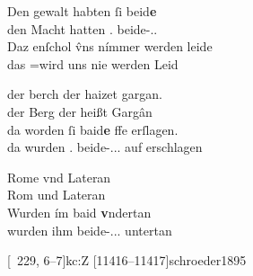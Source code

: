 \begin{exe}
\ex \label{ex:neutralpos}
	\gll Den gewalt habten ſi beid\textbf{e} \\
		den Macht hatten \Tpl\subM.\Nom{} beide-\Nom.\Pl\subM.\St{} \\
\sn \gll Daz enſchol v̂ns nímmer werden leide \\
		das \Neg=wird uns nie werden Leid \\
	\begin{taggedline}{\parencites%
		[\pno~13\ra, 41--42]{kc:B1}[vgl.]%
		[\pno~18\rb, 3]{kc:A1}
		[\pno~24\vb, 35]{kc:H}
		[\pno~32\ra, 3]{kc:M}
		[\pno~21\ra, 31]{kc:VB}
		[\pno~37\ra, 26]{kc:P}
		[\pno~23\rb, 5]{kc:C1}
		[\pno~25\rb, 39]{kc:K}
		[\pno~83\ra, 5]{kc:Z}
		[4261--4264]{schroeder1895}
	}
	\trans {}
	\end{taggedline}

\ex \label{ex:neutralpos2}
	\begin{xlist}
	\ex \label{ex:neutralpos2_1}
		\gll der berch der haizet gargan. \\
			der Berg der heißt Gargân \\
	\sn \gll da worden ſi baid\textbf{e} \textbf{}ffe erſlagen. \\
			da wurden \Tpl\subM.\Nom{} beide-\Nom.\Pl.\MascM.\St{} auf
				erschlagen \\
		\begin{taggedline}{\parencites%
			[\pno~33\rb, 28--30]{kc:A1}[vgl.]%
			[\pno~46\ra, 12]{kc:H}
			[\pno~58\vb, 15]{kc:M}
			[\pno~40\va, 15]{kc:C1}
			[\pno~46\va, 30]{kc:K}
			[\pno~152\va, 5]{kc:Z}
			[7704--7705]{schroeder1895}}
		\trans {}
		\end{taggedline}

	\ex \label{ex:neutralpos2_2}
		\gll Rome vnd Lateran \\
			Rom und Lateran \\
	\sn \gll Wurden ím baid\textbf{} \textbf{v}ndertan \\
			wurden ihm beide-\Nom.\Pl.\NeutI.\St{} untertan \\
		\begin{taggedline}{\parencites%
			[\pno~68\vb, 13--14]{kc:K}[vgl.]%
			[\pno~49\vb, 15--16]{kc:A1}
			[\pno~69\ra, 29--30]{kc:H}
			[\pno~87\ra, 32--33]{kc:M}
			[\pno~31\vb, 18--19]{kc:B1}
			[\pno~82\va, 45--46]{kc:VB}
			[\pno~60\ra, 14--15]{kc:C1}
			[\pno~229\ra, 6--7]{kc:Z}
			[11416--11417]{schroeder1895}}
		\trans {}
		\end{taggedline}
		\\
	\end{xlist}
\end{exe}

